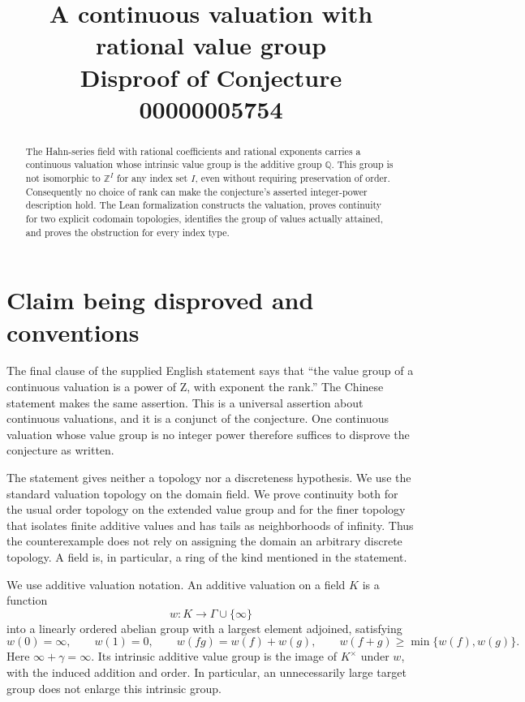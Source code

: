 \documentclass[11pt]{article}
\title{A continuous valuation with rational value group\\
\large Disproof of Conjecture 00000005754}
\author{}
\date{}
\newcommand{\Q}{\mathbb{Q}}
\newcommand{\Z}{\mathbb{Z}}
\begin{document}
\maketitle

\begin{abstract}
The Hahn-series field with rational coefficients and rational exponents carries a continuous
valuation whose intrinsic value group is the additive group $\Q$. This group is not isomorphic
to $\Z^I$ for any index set $I$, even without requiring preservation of order. Consequently no
choice of rank can make the conjecture's asserted integer-power description hold. The Lean
formalization constructs the valuation, proves continuity for two explicit codomain topologies,
identifies the group of values actually attained, and proves the obstruction for every index type.
\end{abstract}

\section{Claim being disproved and conventions}

The final clause of the supplied English statement says that ``the value group of a continuous
valuation is a power of Z, with exponent the rank.'' The Chinese statement makes the same
assertion. This is a universal assertion about continuous valuations, and it is a conjunct of the
conjecture. One continuous valuation whose value group is no integer power therefore suffices
to disprove the conjecture as written.

The statement gives neither a topology nor a discreteness hypothesis. We use the standard
valuation topology on the domain field. We prove continuity both for the usual order topology
on the extended value group and for the finer topology that isolates finite additive values and
has tails as neighborhoods of infinity. Thus the counterexample does not rely on assigning the
domain an arbitrary discrete topology. A field is, in particular, a ring of the kind mentioned in
the statement.

We use additive valuation notation. An additive valuation on a field $K$ is a function
\[
 w:K\longrightarrow \Gamma\cup\{\infty\}
\]
into a linearly ordered abelian group with a largest element adjoined, satisfying
\[
 w(0)=\infty,\qquad w(1)=0,\qquad
 w(fg)=w(f)+w(g),\qquad w(f+g)\geq\min\{w(f),w(g)\}.
\]
Here $\infty+\gamma=\infty$. Its intrinsic additive value group is the image of $K^\times$
under $w$, with the induced addition and order. In particular, an unnecessarily large target
group does not enlarge this intrinsic group.
\end{document}
